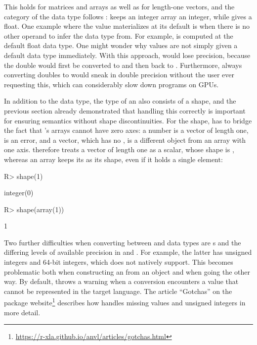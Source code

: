 \documentclass[article,shortnames]{jss}
\renewenvironment{CodeChunk}{\par\addvspace{0.6\baselineskip}\noindent\begin{minipage}{\linewidth}}{\end{minipage}\par\vspace{0.6\baselineskip}}
\begin{document}
This holds for matrices and arrays as well as for length-one vectors, and the category of the data type follows :  keeps an integer array  an integer, while  gives a float.
One example where the  value materializes at its default is when there is no other operand to infer the data type from.
For example,  is computed at the default float data type.
One might wonder why  values are not simply given a default data type immediately.
With this approach,  would lose precision, because the  double  would first be converted to  and then back to .
Furthermore, always converting  doubles to  would sneak in double precision without the user ever requesting this, which can considerably slow down programs on GPUs.

In addition to the data type, the type of an  also consists of a shape, and the previous section already demonstrated that handling this correctly is important for ensuring semantics without shape discontinuities.
For the shape,  has to bridge the fact that 's arrays cannot have zero axes: a number is a vector of length one,  is an error, and a vector, which has no , is a different object from an array with one axis.
 therefore treats a vector of length one as a scalar, whose shape is , whereas an  array keeps its  as its shape, even if it holds a single element:

\begin{CodeChunk}
\begin{CodeInput}
R> shape(1)
\end{CodeInput}
\begin{CodeOutput}
integer(0)
\end{CodeOutput}
\begin{CodeInput}
R> shape(array(1))
\end{CodeInput}
\begin{CodeOutput}
[1] 1
\end{CodeOutput}
\end{CodeChunk}

Two further difficulties when converting between  and  data types are s and the differing levels of available precision in  and .
For example, the latter has unsigned integers and 64-bit integers, which  does not natively support.
This becomes problematic both when constructing an  from an  object and when going the other way.
By default,  throws a warning when a conversion encounters a value that cannot be represented in the target language.
The article ``Gotchas'' on the package website\footnote{\url{https://r-xla.github.io/anvl/articles/gotchas.html}} describes how  handles missing values and unsigned integers in more detail.
\end{document}
